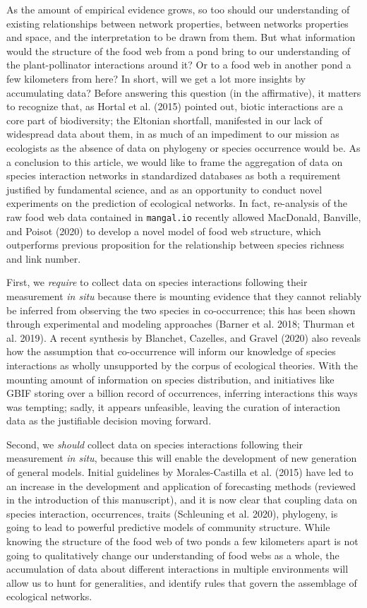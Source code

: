 \documentclass[10pt,oneside]{article}
\begin{document}
As the amount of empirical evidence grows, so too should our
understanding of existing relationships between network properties,
between networks properties and space, and the interpretation to be
drawn from them. But what information would the structure of the food
web from a pond bring to our understanding of the plant-pollinator
interactions around it? Or to a food web in another pond a few
kilometers from here? In short, will we get a lot more insights by
accumulating data? Before answering this question (in the affirmative),
it matters to recognize that, as Hortal et al. (2015) pointed out,
biotic interactions are a core part of biodiversity; the Eltonian
shortfall, manifested in our lack of widespread data about them, in as
much of an impediment to our mission as ecologists as the absence of
data on phylogeny or species occurrence would be. As a conclusion to
this article, we would like to frame the aggregation of data on species
interaction networks in standardized databases as both a requirement
justified by fundamental science, and as an opportunity to conduct novel
experiments on the prediction of ecological networks. In fact,
re-analysis of the raw food web data contained in \texttt{mangal.io}
recently allowed MacDonald, Banville, and Poisot (2020) to develop a
novel model of food web structure, which outperforms previous
proposition for the relationship between species richness and link
number.

First, we \emph{require} to collect data on species interactions
following their measurement \emph{in situ} because there is mounting
evidence that they cannot reliably be inferred from observing the two
species in co-occurrence; this has been shown through experimental and
modeling approaches (Barner et al. 2018; Thurman et al. 2019). A recent
synthesis by Blanchet, Cazelles, and Gravel (2020) also reveals how the
assumption that co-occurrence will inform our knowledge of species
interactions as wholly unsupported by the corpus of ecological theories.
With the mounting amount of information on species distribution, and
initiatives like GBIF storing over a billion record of occurrences,
inferring interactions this ways was tempting; sadly, it appears
unfeasible, leaving the curation of interaction data as the justifiable
decision moving forward.

Second, we \emph{should} collect data on species interactions following
their measurement \emph{in situ}, because this will enable the
development of new generation of general models. Initial guidelines by
Morales-Castilla et al. (2015) have led to an increase in the
development and application of forecasting methods (reviewed in the
introduction of this manuscript), and it is now clear that coupling data
on species interaction, occurrences, traits (Schleuning et al. 2020),
phylogeny, is going to lead to powerful predictive models of community
structure. While knowing the structure of the food web of two ponds a
few kilometers apart is not going to qualitatively change our
understanding of food webs as a whole, the accumulation of data about
different interactions in multiple environments will allow us to hunt
for generalities, and identify rules that govern the assemblage of
ecological networks.
\end{document}
